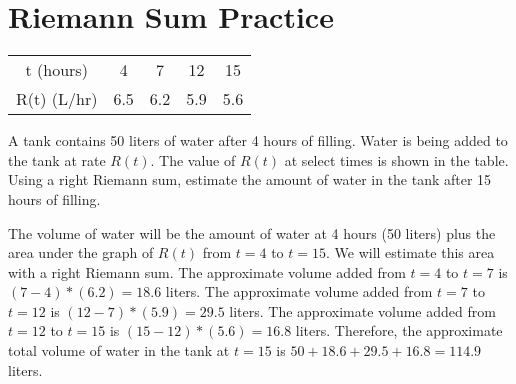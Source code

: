 \section{Riemann Sum Practice}

\begin{Exercise}[label=rsum2]
	\begin{center}
		\begin{tabular}{c|c|c|c|c}
			t (hours) & 4 & 7 & 12 & 15\\
			R(t) (L/hr) & 6.5 & 6.2 & 5.9 & 5.6\\
		\end{tabular}
	\end{center}
	A tank contains 50 liters of water after 4 hours of filling. Water is being added to the tank at rate $R(t)$. The value of $R(t)$ at select times is shown in the table. Using a right Riemann sum, estimate the amount of water in the tank after 15 hours of filling. 
\end{Exercise}

\begin{Answer}[ref=rsum2]
	The volume of water will be the amount of water at 4 hours (50 liters) plus the area under the graph of $R(t)$ from $t=4$ to $t=15$. We will estimate this area with a right Riemann sum. The approximate volume added from $t=4$ to $t=7$ is $(7-4)*(6.2) = 18.6$ liters. The approximate volume added from $t=7$ to $t=12$ is $(12-7)*(5.9)=29.5$ liters. The approximate volume added from $t=12$ to $t=15$ is $(15-12)*(5.6) = 16.8$ liters. Therefore, the approximate total volume of water in the tank at $t=15$ is $50 + 18.6 + 29.5 + 16.8 = 114.9$ liters. 
\end{Answer}